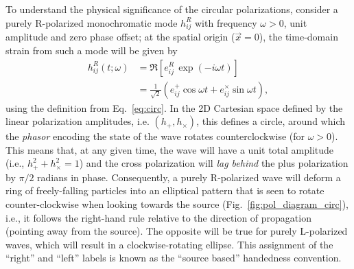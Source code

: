 \documentclass[aps,prd,twocolumn,superscriptaddress,preprintnumbers,floatfix,nofootinbib]{revtex4-2}
\newcommand{\beq}{\begin{equation}}
\newcommand{\eeq}{\end{equation}}
\begin{document}
To understand the physical significance of the circular polarizations,
consider a purely R-polarized monochromatic mode $h^R_{ij}$ with frequency $\omega > 0$, unit amplitude and zero phase offset; at the spatial origin ($\vec{x}=0$), the time-domain strain from such a mode will be given by
\begin{align} \label{eq:circ_example}
h_{ij}^R(t;\omega) &= \Re \left[ e^R_{ij}\, \exp(-i\omega t) \right] \nonumber\\
&= \frac{1}{\sqrt{2}} \left( e^+_{ij} \cos \omega t + e^\times_{ij} \sin \omega t \right) ,
\end{align}
using the definition from Eq.~\eqref{eq:circ}.
In the 2D Cartesian space defined by the linear polarization amplitudes, i.e. $\left(h_+, h_\times\right)$, this defines a circle, around which the \emph{phasor} encoding the state of the wave rotates counterclockwise (for $\omega > 0$).
This means that, at any given time, the wave will have a unit total amplitude (i.e., $h^2_+ + h^2_\times=1$) and the cross polarization will \emph{lag behind} the plus polarization by $\pi/2$ radians in phase.
%
Consequently, a purely R-polarized wave will deform a ring of freely-falling particles into an elliptical pattern that is seen to rotate counter-clockwise when looking towards the source (Fig.~\ref{fig:pol_diagram_circ}), i.e., it follows the right-hand rule relative to the direction of propagation (pointing away from the source).
The opposite will be true for purely L-polarized waves, which will result in a clockwise-rotating ellipse.
This assignment of the ``right'' and ``left'' labels is known as the ``source based'' handedness convention.
\end{document}
